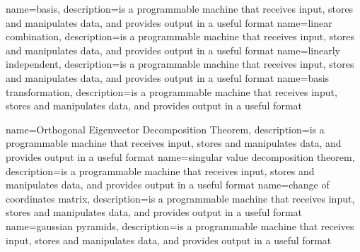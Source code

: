 {
  name=basis,
  description={is a programmable machine that receives input,
               stores and manipulates data, and provides
               output in a useful format}
}
{
  name=linear combination,
  description={is a programmable machine that receives input,
               stores and manipulates data, and provides
               output in a useful format}
}
{
  name=linearly independent,
  description={is a programmable machine that receives input,
               stores and manipulates data, and provides
               output in a useful format}
}
{
  name=basis transformation,
  description={is a programmable machine that receives input,
               stores and manipulates data, and provides
               output in a useful format}
}

{
  name=Orthogonal Eigenvector Decomposition Theorem,
  description={is a programmable machine that receives input,
               stores and manipulates data, and provides
               output in a useful format}
}
{
  name=singular value decomposition theorem,
  description={is a programmable machine that receives input,
               stores and manipulates data, and provides
               output in a useful format}
}
{
  name=change of coordinates matrix,
  description={is a programmable machine that receives input,
               stores and manipulates data, and provides
               output in a useful format}
}
{
  name=gaussian pyramids,
  description={is a programmable machine that receives input,
               stores and manipulates data, and provides
               output in a useful format}
}